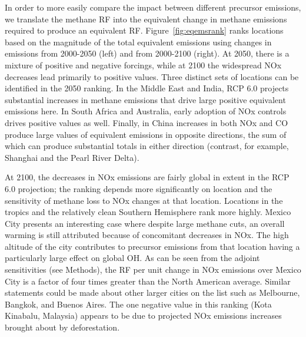 In order to more easily compare the impact between different precursor emissions, we translate the methane RF into the equivalent change in methane emissions required to produce an equivalent RF. Figure~\ref{fig:eqemsrank} ranks locations based on the magnitude of the total equivalent emissions using changes in emissions from 2000-2050 (left) and from 2000-2100 (right). At 2050, there is a mixture of positive and negative forcings, while at 2100 the widespread NOx decreases lead primarily to positive values. Three distinct sets of locations can be identified in the 2050 ranking. In the Middle East and India, RCP 6.0 projects substantial increases in methane emissions that drive large positive equivalent emissions here. In South Africa and Australia, early adoption of NOx controls drives positive values as well. Finally, in China increases in both NOx and CO produce large values of equivalent emissions in opposite directions, the sum of which can produce substantial totals in either direction (contrast, for example, Shanghai and the Pearl River Delta).

At 2100, the decreases in NOx emissions are fairly global in extent in the RCP 6.0 projection; the ranking depends more significantly on location and the sensitivity of methane loss to NOx changes at that location. Locations in the tropics and the relatively clean Southern Hemisphere rank more highly. Mexico City presents an interesting case where despite large methane cuts, an overall warming is still attributed because of concomitant decreases in NOx. The high altitude of the city contributes to precursor emissions from that location having a particularly large effect on global OH. As can be seen from the adjoint sensitivities (see Methods), the RF per unit change in NOx emissions over Mexico City is a factor of four times greater than the North American average. Similar statements could be made about other larger cities on the list such as Melbourne, Bangkok, and Buenos Aires. The one negative value in this ranking (Kota Kinabalu, Malaysia) appears to be due to projected NOx emissions increases brought about by deforestation.